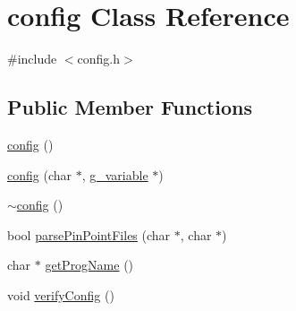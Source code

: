 \hypertarget{classconfig}{
\section{config Class Reference}
\label{classconfig}
}


{\ttfamily \#include $<$config.h$>$}

\subsection*{Public Member Functions}
\begin{DoxyCompactItemize}
\item 
\hyperlink{classconfig_ab1b245308f26ce7979e4c37e93869706}{config} ()
\item 
\hyperlink{classconfig_a83e543efde26a3bd118757ddf1fa098f}{config} (char $\ast$, \hyperlink{structg__variable}{g\_\-variable} $\ast$)
\item 
\hyperlink{classconfig_a9b8b1ccf97780676a19296f72fee3aae}{$\sim$config} ()
\item 
bool \hyperlink{classconfig_ac94cb602566243ecb9f76d05cb3199fa}{parsePinPointFiles} (char $\ast$, char $\ast$)
\item 
char $\ast$ \hyperlink{classconfig_a9530da432f14dc0e96f794e13475e4be}{getProgName} ()
\item 
void \hyperlink{classconfig_a130fd7b4a660ecb2a3522221427f5956}{verifyConfig} ()
\end{DoxyCompactItemize}
